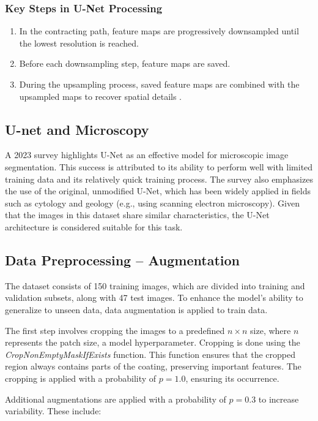 \subsubsection{Key Steps in U-Net Processing}
\begin{enumerate}
    \item In the contracting path, feature maps are progressively downsampled until the lowest resolution is reached.
    \item Before each downsampling step, feature maps are saved.
    \item During the upsampling process, saved feature maps are combined with the upsampled maps to recover spatial details \cite{ronneberger_u-net_2015}.
\end{enumerate}

\subsection{U-net and Microscopy}
A 2023 survey \cite{wu_state---art_2024} highlights U-Net as an effective model for microscopic image segmentation. This success is attributed to its ability to perform well with limited training data and its relatively quick training process. The survey also emphasizes the use of the original, unmodified U-Net, which has been widely applied in fields such as cytology and geology \cite{chen_deep_2020} (e.g., using scanning electron microscopy). Given that the images in this dataset share similar characteristics, the U-Net architecture is considered suitable for this task.

\subsection{Data Preprocessing – Augmentation}
The dataset consists of 150 training images, which are divided into training and validation subsets, along with 47 test images. To enhance the model's ability to generalize to unseen data, data augmentation is applied to train data.

The first step involves cropping the images to a predefined $n \times n$ size, where $n$ represents the patch size, a model hyperparameter. Cropping is done using the \textit{CropNonEmptyMaskIfExists}\cite{info11020125} function. This function ensures that the cropped region always contains parts of the coating, preserving important features. The cropping is applied with a probability of $p=1.0$, ensuring its occurrence.

Additional augmentations are applied with a probability of $p=0.3$ to increase variability. These include:

